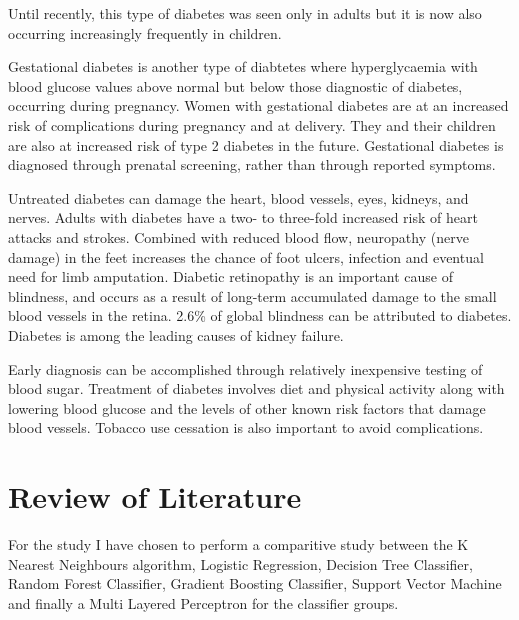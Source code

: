 \documentclass[12pt]{article}
\begin{document}
Until recently, this type of diabetes was seen only in adults but it is now also occurring increasingly frequently in children.

Gestational diabetes is another type of diabtetes where hyperglycaemia with blood glucose values above normal but below those diagnostic of diabetes, occurring during pregnancy. Women with gestational diabetes are at an increased risk of complications during pregnancy and at delivery. They and their children are also at increased risk of type 2 diabetes in the future. Gestational diabetes is diagnosed through prenatal screening, rather than through reported symptoms.

Untreated diabetes can damage the heart, blood vessels, eyes, kidneys, and nerves. Adults with diabetes have a two- to three-fold increased risk of heart attacks and strokes. Combined with reduced blood flow, neuropathy (nerve damage) in the feet increases the chance of foot ulcers, infection and eventual need for limb amputation. Diabetic retinopathy is an important cause of blindness, and occurs as a result of long-term accumulated damage to the small blood vessels in the retina. 2.6\% of global blindness can be attributed to diabetes. Diabetes is among the leading causes of kidney failure.

Early diagnosis can be accomplished through relatively inexpensive testing of blood sugar. Treatment of diabetes involves diet and physical activity along with lowering blood glucose and the levels of other known risk factors that damage blood vessels. Tobacco use cessation is also important to avoid complications. 

\newpage
\section{Review of Literature}
For the study I have chosen to perform a comparitive study between the K Nearest Neighbours algorithm, Logistic Regression, Decision Tree Classifier, Random Forest Classifier, Gradient Boosting Classifier, Support Vector Machine and finally a Multi Layered Perceptron for the classifier groups. 

\end{document}
